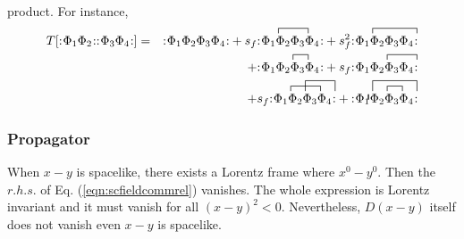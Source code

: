 product.
For instance, 
\begin{eqnarray}
T[\normalprod{\Phi_1 \Phi_2} \normalprod{\Phi_3 \Phi_4} ]
&=&
\normalprod{\Phi_1 \Phi_2 \Phi_3 \Phi_4}
+
s_f \normalprod{
\acontraction[1ex]{}{\Phi}{{}_1 \Phi_2}{\Phi}
\Phi_1 \Phi_2 \Phi_3 \Phi_4}
+
s_f^2 
\normalprod{
\acontraction[1ex]{}{\Phi}{{}_1 \Phi_2 \Phi_3}{\Phi}
\Phi_1 \Phi_2 \Phi_3 \Phi_4}
\nonumber\\
&&+
\normalprod{\acontraction[1ex]{\Phi_1 }{\Phi}{{}_2}{\Phi}\Phi_1 \Phi_2 \Phi_3 \Phi_4}
+
s_f
\normalprod{\acontraction[1ex]{\Phi_1 }{\Phi}{{}_2 \Phi_3}{\Phi}\Phi_1 \Phi_2 \Phi_3 \Phi_4}
\nonumber\\
&&
+
s_f
\normalprod{
\acontraction[1ex]{}{\Phi}{{}_1 \Phi_2}{\Phi}
\acontraction[2ex]{\Phi_1}{\Phi}{{}_2 \Phi_3}{\Phi}
\Phi_1 \Phi_2 \Phi_3 \Phi_4}
+
\normalprod{\acontraction[1ex]{}{}{}{}
\acontraction[2ex]{}{\Phi}{{}_1 \Phi_2 \Phi_3}{\Phi}
\acontraction[1ex]{\Phi_1}{\Phi}{{}_2}{\Phi}
\Phi_1 \Phi_2 \Phi_3 \Phi_4}
\label{eqn:TofNormals}
\end{eqnarray}


\newpage

\subsubsection{Propagator}
When $x-y$ is spacelike, there exists a Lorentz frame where $x^0 - y^0$.
Then the $r.h.s.$ of Eq. (\ref{eqn:scfieldcommrel}) vanishes. 
The whole expression is Lorentz invariant and it must vanish for all $(x-y)^2 < 0$.
Nevertheless, $D(x-y)$ itself does not vanish even $x-y$ is spacelike.

